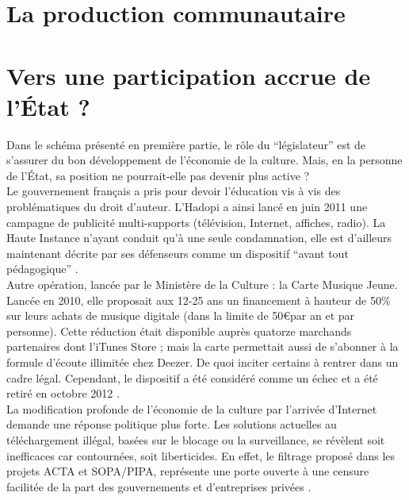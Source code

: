 \documentclass[a4paper]{report}
\begin{document}
	\section{La production communautaire}
	


	\section{Vers une participation accrue de l'État ?}
	Dans le schéma présenté en première partie, le rôle du ``législateur'' est de s'assurer du bon développement de l'économie de la culture. Mais, en la personne de l'État, sa position ne pourrait-elle pas devenir plus active ?\\

	Le gouvernement français a pris pour devoir l'éducation vis à vis des problématiques du droit d'auteur. L'Hadopi a ainsi lancé en juin 2011 une campagne de publicité multi-supports (télévision, Internet, affiches, radio). La Haute Instance n'ayant conduit qu'à une seule condamnation, elle est d'ailleurs maintenant décrite par ses défenseurs comme un dispositif ``avant tout pédagogique'' \cite{podcast-industrie-musicale}.\\

	Autre opération, lancée par le Ministère de la Culture : la Carte Musique Jeune. Lancée en 2010, elle proposait aux 12-25 ans un financement à hauteur de 50\% sur leurs achats de musique digitale (dans la limite de 50\euro par an et par personne). Cette réduction était disponible auprès quatorze marchands partenaires dont l'iTunes Store ; mais la carte permettait aussi de s'abonner à la formule d'écoute illimitée chez Deezer. De quoi inciter certains à rentrer dans un cadre légal. Cependant, le dispositif a été considéré comme un échec \cite{carte-musique-jeune-echec} et a été retiré en octobre 2012 \cite{carte-musique-jeune-arret}.\\

	La modification profonde de l'économie de la culture par l'arrivée d'Internet demande une réponse politique plus forte. Les solutions actuelles au téléchargement illégal, basées sur le blocage ou la surveillance, se révèlent soit inefficaces car contournées, soit liberticides. En effet, le filtrage proposé dans les projets ACTA et SOPA/PIPA, représente une porte ouverte à une censure facilitée de la part des gouvernements et d'entreprises privées \cite{quadrature-filtrage}.\\
\end{document}

